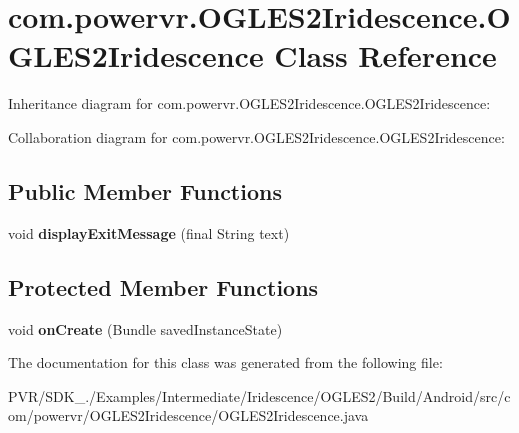 \hypertarget{classcom_1_1powervr_1_1_o_g_l_e_s2_iridescence_1_1_o_g_l_e_s2_iridescence}{\section{com.\+powervr.\+O\+G\+L\+E\+S2\+Iridescence.\+O\+G\+L\+E\+S2\+Iridescence Class Reference}
\label{classcom_1_1powervr_1_1_o_g_l_e_s2_iridescence_1_1_o_g_l_e_s2_iridescence}
}


Inheritance diagram for com.\+powervr.\+O\+G\+L\+E\+S2\+Iridescence.\+O\+G\+L\+E\+S2\+Iridescence\+:


Collaboration diagram for com.\+powervr.\+O\+G\+L\+E\+S2\+Iridescence.\+O\+G\+L\+E\+S2\+Iridescence\+:
\subsection*{Public Member Functions}
\begin{DoxyCompactItemize}
\item 
\hypertarget{classcom_1_1powervr_1_1_o_g_l_e_s2_iridescence_1_1_o_g_l_e_s2_iridescence_aa2d751de60b450c6025ab1b0116a4be6}{void {\bfseries display\+Exit\+Message} (final String text)}\label{classcom_1_1powervr_1_1_o_g_l_e_s2_iridescence_1_1_o_g_l_e_s2_iridescence_aa2d751de60b450c6025ab1b0116a4be6}

\end{DoxyCompactItemize}
\subsection*{Protected Member Functions}
\begin{DoxyCompactItemize}
\item 
\hypertarget{classcom_1_1powervr_1_1_o_g_l_e_s2_iridescence_1_1_o_g_l_e_s2_iridescence_a49acd9a856a8c5fef89d9a8d9b372593}{void {\bfseries on\+Create} (Bundle saved\+Instance\+State)}\label{classcom_1_1powervr_1_1_o_g_l_e_s2_iridescence_1_1_o_g_l_e_s2_iridescence_a49acd9a856a8c5fef89d9a8d9b372593}

\end{DoxyCompactItemize}


The documentation for this class was generated from the following file\+:\begin{DoxyCompactItemize}
\item 
P\+V\+R/\+S\+D\+K\+\_./\+Examples/\+Intermediate/\+Iridescence/\+O\+G\+L\+E\+S2/\+Build/\+Android/src/com/powervr/\+O\+G\+L\+E\+S2\+Iridescence/O\+G\+L\+E\+S2\+Iridescence.\+java\end{DoxyCompactItemize}
